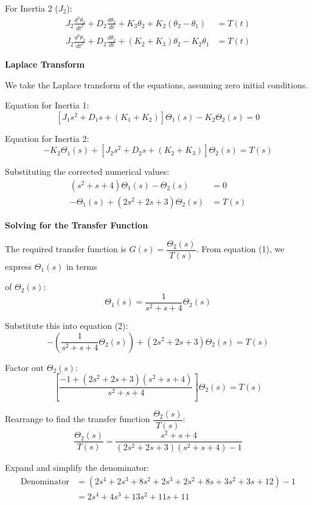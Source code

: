 \documentclass[11pt]{article}
\begin{document}
{For Inertia 2 ($J_2$):}
\begin{align*}
    J_2 \frac{d^2\theta_2}{dt^2} + D_2 \frac{d\theta_2}{dt} + K_3 \theta_2 + K_2(\theta_2 - \theta_1) &= T(t) \\
    J_2 \frac{d^2\theta_2}{dt^2} + D_2\frac{d\theta_2}{dt} + (K_2 + K_3)\theta_2 - K_2\theta_1 &= T(t)
\end{align*}

\newpage
\noindent\textbf{Laplace Transform}
\vspace{12pt}

We take the Laplace transform of the equations, assuming zero initial conditions.

Equation for Inertia 1:
\[
[J_1 s^2 + D_1s + (K_1 + K_2)]\Theta_1(s) - K_2\Theta_2(s) = 0
\]

Equation for Inertia 2:
\[
-K_2\Theta_1(s) + [J_2 s^2 + D_2s + (K_2 + K_3)]\Theta_2(s) = T(s)
\]

Substituting the corrected numerical values:
\begin{align}
    (s^2 + s + 4)\Theta_1(s) - \Theta_2(s) &= 0 \tag{1} \\
    -\Theta_1(s) + (2s^2 + 2s + 3)\Theta_2(s) &= T(s) \tag{2}
\end{align}

\noindent\textbf{Solving for the Transfer Function}
\vspace{8pt}

The required transfer function is $G(s) = \dfrac{\Theta_2(s)}{T(s)}$. From equation (1), we express $\Theta_1(s)$ in terms 

of $\Theta_2(s)$:
\[
\Theta_1(s) = \frac{1}{s^2 + s + 4} \Theta_2(s)
\]

Substitute this into equation (2):
\[
- \left( \frac{1}{s^2 + s + 4} \Theta_2(s) \right) + (2s^2 + 2s + 3) \Theta_2(s) = T(s)
\]

Factor out $\Theta_2(s)$:
\[
\left[ \frac{-1 + (2s^2 + 2s + 3)(s^2 + s + 4)}{s^2 + s + 4} \right] \Theta_2(s) = T(s)
\]

Rearrange to find the transfer function $\dfrac{\Theta_2(s)}{T(s)}$:
\[
\frac{\Theta_2(s)}{T(s)} = \frac{s^2 + s + 4}{(2s^2 + 2s + 3)(s^2 + s + 4) - 1}
\]

Expand and simplify the denominator:
\begin{align*}
    \text{Denominator} &= (2s^4 + 2s^3 + 8s^2 + 2s^3 + 2s^2 + 8s + 3s^2 + 3s + 12) - 1 \\
    &= 2s^4 + 4s^3 + 13s^2 + 11s + 11
\end{align*}
\end{document}
